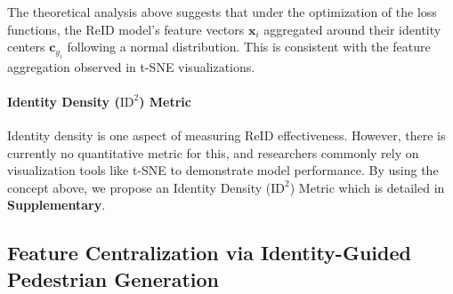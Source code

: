 The theoretical analysis above suggests that under the optimization of the loss functions, the ReID model's feature vectors $\mathbf{x}_i$ aggregated around their identity centers $\mathbf{c}_{y_i}$ following a normal distribution. This is consistent with the feature aggregation observed in t-SNE visualizations.

\paragraph{Identity Density ($\text{ID}^2$) Metric}
Identity density is one aspect of measuring ReID effectiveness. However, there is currently no quantitative metric for this, and researchers commonly rely on visualization tools like t-SNE to demonstrate model performance. By using the concept above, we propose an Identity Density ($\text{ID}^2$) Metric which is detailed in \textbf{Supplementary}.






\subsection{Feature Centralization via Identity-Guided Pedestrian Generation}


